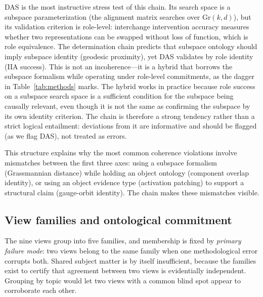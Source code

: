 \documentclass{article}
\newcommand{\Gr}{\mathrm{Gr}}
\begin{document}
DAS is the most instructive stress test of this chain.  Its search space is a subspace parameterization (the alignment matrix searches over $\Gr(k,d)$), but its validation criterion is role-level: interchange intervention accuracy measures whether two representations can be swapped without loss of function, which is role equivalence.  The determination chain predicts that subspace ontology should imply subspace identity (geodesic proximity), yet DAS validates by role identity (IIA success).  This is not an incoherence---it is a hybrid that borrows the subspace formalism while operating under role-level commitments, as the dagger in Table~\ref{tab:methods} marks.  The hybrid works in practice because role success on a subspace search space is a sufficient condition for the subspace being causally relevant, even though it is not the same as confirming the subspace by its own identity criterion.  The chain is therefore a strong tendency rather than a strict logical entailment: deviations from it are informative and should be flagged (as we flag DAS), not treated as errors.

This structure explains why the most common coherence violations involve
mismatches between the first three axes: using a subspace formalism
(Grassmannian distance) while holding an object ontology (component
overlap identity), or using an object evidence type (activation patching)
to support a structural claim (gauge-orbit identity).  The chain makes
these mismatches visible.

\subsection{View families and ontological commitment}\label{sec:families}

The nine views group into five families, and membership is fixed by
\emph{primary failure mode}: two views belong to the same family when one
methodological error corrupts both.  Shared subject matter is by itself
insufficient, because the families exist to certify that agreement between
two views is evidentially independent.  Grouping by topic would let two
views with a common blind spot appear to corroborate each other.
\end{document}
